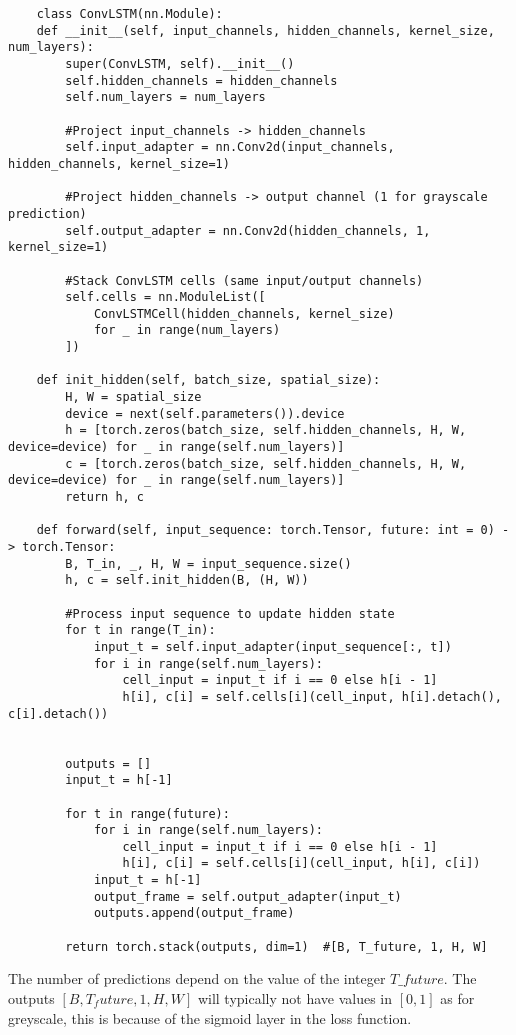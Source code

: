 \documentclass[a4paper,12pt]{article}
\begin{document}
  \begin{lstlisting}
    class ConvLSTM(nn.Module):
    def __init__(self, input_channels, hidden_channels, kernel_size, num_layers):
        super(ConvLSTM, self).__init__()
        self.hidden_channels = hidden_channels
        self.num_layers = num_layers

        #Project input_channels -> hidden_channels
        self.input_adapter = nn.Conv2d(input_channels, hidden_channels, kernel_size=1)

        #Project hidden_channels -> output channel (1 for grayscale prediction)
        self.output_adapter = nn.Conv2d(hidden_channels, 1, kernel_size=1)

        #Stack ConvLSTM cells (same input/output channels)
        self.cells = nn.ModuleList([
            ConvLSTMCell(hidden_channels, kernel_size)
            for _ in range(num_layers)
        ])

    def init_hidden(self, batch_size, spatial_size):
        H, W = spatial_size
        device = next(self.parameters()).device
        h = [torch.zeros(batch_size, self.hidden_channels, H, W, device=device) for _ in range(self.num_layers)]
        c = [torch.zeros(batch_size, self.hidden_channels, H, W, device=device) for _ in range(self.num_layers)]
        return h, c

    def forward(self, input_sequence: torch.Tensor, future: int = 0) -> torch.Tensor:
        B, T_in, _, H, W = input_sequence.size()
        h, c = self.init_hidden(B, (H, W))
        
        #Process input sequence to update hidden state
        for t in range(T_in):
            input_t = self.input_adapter(input_sequence[:, t])
            for i in range(self.num_layers):
                cell_input = input_t if i == 0 else h[i - 1]
                h[i], c[i] = self.cells[i](cell_input, h[i].detach(), c[i].detach())

    
        outputs = []
        input_t = h[-1]
    
        for t in range(future):
            for i in range(self.num_layers):
                cell_input = input_t if i == 0 else h[i - 1]
                h[i], c[i] = self.cells[i](cell_input, h[i], c[i])
            input_t = h[-1]
            output_frame = self.output_adapter(input_t)
            outputs.append(output_frame)
    
        return torch.stack(outputs, dim=1)  #[B, T_future, 1, H, W]
  \end{lstlisting}
  The number of predictions depend on the value of the integer $T\_future$. The outputs $[B, T_future, 1, H, W]$ will typically not have values in $[0,1]$ as for greyscale, this is because of the sigmoid layer in the loss function. 
\end{document}
